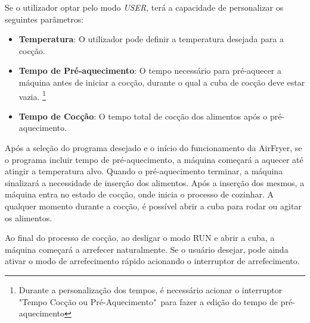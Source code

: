 \documentclass[a4paper, 11pt, onecolumn, oneside]{report}
\begin{document}
Se o utilizador optar pelo modo \textit{USER}, terá a capacidade de personalizar os seguintes parâmetros:
\begin{itemize}
    \item \textbf{Temperatura}: O utilizador pode definir a temperatura desejada para a cocção.
    \item \textbf{Tempo de Pré-aquecimento}: O tempo necessário para pré-aquecer a máquina antes de iniciar a cocção, durante o qual a cuba de cocção deve estar vazia. \footnote{Durante a personalização dos tempos, é necessário acionar o interruptor "Tempo Cocção ou Pré-Aquecimento"\ para fazer a edição do tempo de pré-aquecimento}
    \item \textbf{Tempo de Cocção}: O tempo total de cocção dos alimentos após o pré-aquecimento.
\end{itemize}
  

Após a seleção do programa desejado e o início do funcionamento da AirFryer, se o programa incluir tempo de pré-aquecimento, a máquina começará a aquecer até atingir a temperatura alvo. Quando o pré-aquecimento terminar, a máquina sinalizará a necessidade de inserção dos alimentos. Após a inserção dos mesmos, a máquina entra no estado de cocção, onde inicia o processo de cozinhar. A qualquer momento durante a cocção, é possível abrir a cuba para rodar ou agitar os alimentos.
\par
Ao final do processo de cocção, ao desligar o modo RUN e abrir a cuba, a máquina começará a arrefecer naturalmente. Se o usuário desejar, pode ainda ativar o modo de arrefecimento rápido acionando o interruptor de arrefecimento.
\end{document}
